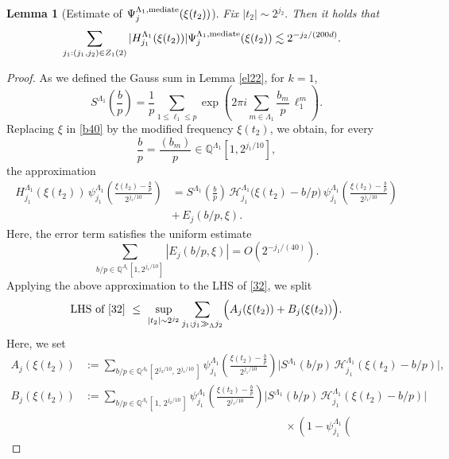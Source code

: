 \documentclass[11 pt,letterpaper]{amsart}
\theoremstyle{plain}
\newtheorem{lemma}{Lemma}\numberwithin{lemma}{section}
\theoremstyle{definition}
\theoremstyle{remark} \theoremstyle{exam} \theoremstyle{ob}
\numberwithin{equation}{section}
\begin{document}
\begin{lemma}[Estimate of $\Psi^{\Lambda_1,\rm{mediate}}_{j}(\xi(t_2))$]\label{prop41}
 Fix $|t_2|\sim 2^{j_2}.$ Then it holds that
\begin{align}\label{32}
&\sum_{j_1:(j_1,j_2)\in Z_1(2)}|H^{\Lambda_1}_{j_1}(\xi(t_2))|\Psi^{\Lambda_1,\rm{mediate}}_{j}(\xi(t_2)) \lesssim 2^{-j_2/(200d)}.
\end{align}
\end{lemma}
 
 
\begin{proof}
As we defined the Gauss sum in Lemma \ref{el22}, for $k=1$,  
\[
S^{\Lambda_1}\!\left(\frac{b}{p}\right)
   = \frac{1}{p}\sum_{1\le \ell_1\le p}
      \exp\!\left(2\pi i \sum_{m\in\Lambda_1}
      \frac{b_m}{p}\,\ell_1^m\right).
\]
Replacing $\xi$ in \eqref{b40} by the modified frequency $\xi(t_2)$, we obtain, for every 
\[
\frac{b}{p}=\frac{(b_m)}{p} \in \mathbb{Q}^{\Lambda_1}[1,2^{j_1/10}],
\]
the approximation
\[
\begin{aligned}
H_{j_1}^{\Lambda_1}(\xi(t_2))\,
\psi^{\Lambda_1}_{j_1}\!\left(\frac{\xi(t_2)-\frac{b}{p}}{2^{j_1/10}}\right)
&= 
S^{\Lambda_1}\!\left(\frac{b}{p}\right)\,
\mathcal{H}^{\Lambda_1}_{j_1}\!\bigl(\xi(t_2)-b/p\bigr)\,
\psi^{\Lambda_1}_{j_1}\!\left(\frac{\xi(t_2)-\frac{b}{p}}{2^{j_1/10}}\right)  \\
& 
+\, E_{j}(b/p,\xi).
\end{aligned}
\]
Here, the error term satisfies the uniform estimate
\[
\sum_{b/p\in \mathbb{Q}^{\Lambda_1}[1,2^{j_1/10}]}
   |E_j(b/p,\xi)|
   = O(2^{- j_1/(40)}).
\]
Applying the above approximation to the LHS of \eqref{32},  
we split
\[
\text{LHS of \eqref{32}}
   \ \le\ 
   \sup_{|t_2|\sim 2^{j_2}}
   \sum_{\substack{j_1; j_1\gg_{\Lambda} j_2}}
   \Bigl(
      A_j(\xi(t_2)) + B_j(\xi(t_2))
   \Bigr).
\]
Here, we   set
\[
\begin{aligned}
A_j(\xi(t_2))
&:=
\sum_{b/p\in \mathbb{Q}^{\Lambda_1}[\,2^{j_2/10},\,2^{j_1/10}\,]}
\psi^{\Lambda_1}_{j_1}\!\left(
   \frac{\xi(t_2)-\frac{b}{p}}{2^{j_1/10}}
\right)
\bigl|
   S^{\Lambda_1}(b/p)\,
   \mathcal{H}^{\Lambda_1}_{j_1}(\xi(t_2)-b/p)
\bigr|,
\\[1em]
B_j(\xi(t_2))
&:=
\sum_{b/p\in \mathbb{Q}^{\Lambda_1}[\,1,\,2^{j_2/10}\,]}
\psi^{\Lambda_1}_{j_1}\!\left(
   \frac{\xi(t_2)-\frac{b}{p}}{2^{j_1/10}}
\right)
\bigl|
   S^{\Lambda_1}(b/p)\,
   \mathcal{H}^{\Lambda_1}_{j_1}(\xi(t_2)-b/p)
\bigr|
\\
&\qquad\qquad \qquad\qquad\qquad\qquad\qquad\qquad\qquad\times
\left(
   1-
   \psi^{\Lambda_1}_{j_1}\!\left(

\end{aligned}\]
\end{proof}
\end{document}
